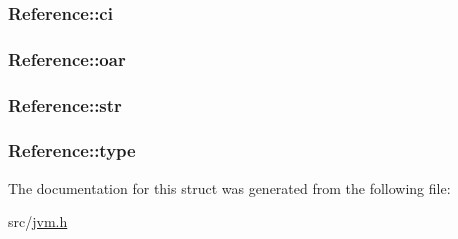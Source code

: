 \subsubsection[{\texorpdfstring{ci}{ci}}]{ Reference\+::ci}\hypertarget{structReference_add84ffa45a635db324cfcbe73ce7074c}{}\label{structReference_add84ffa45a635db324cfcbe73ce7074c}
\subsubsection[{\texorpdfstring{oar}{oar}}]{ Reference\+::oar}\hypertarget{structReference_a5eac3f1de74138347244ca0ef623ee24}{}\label{structReference_a5eac3f1de74138347244ca0ef623ee24}
\subsubsection[{\texorpdfstring{str}{str}}]{ Reference\+::str}\hypertarget{structReference_a64f6150b1edb24e6a4bfa5c256539d3c}{}\label{structReference_a64f6150b1edb24e6a4bfa5c256539d3c}
\subsubsection[{\texorpdfstring{type}{type}}]{ Reference\+::type}\hypertarget{structReference_a411b420a60aa7e3ac2c0d46351dc9f13}{}\label{structReference_a411b420a60aa7e3ac2c0d46351dc9f13}


The documentation for this struct was generated from the following file\+:\begin{DoxyCompactItemize}
\item 
src/\hyperlink{jvm_8h}{jvm.\+h}\end{DoxyCompactItemize}
